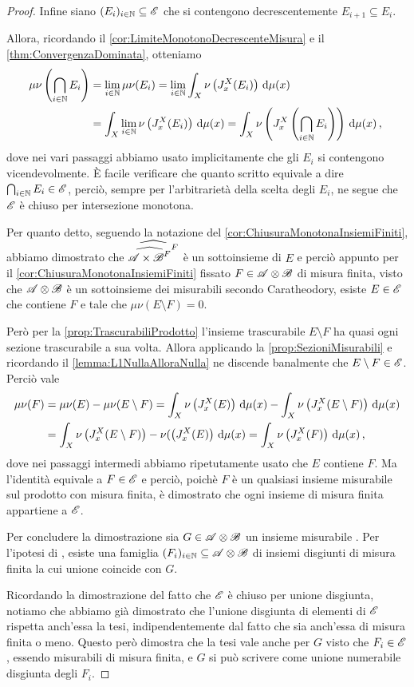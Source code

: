 \begin{proof}
	Infine siano $(E_i)_{i\in\mathbb N}\subseteq \mathscr E$ che si contengono decrescentemente $E_{i+1}\subseteq E_i$.
	
	Allora, ricordando il \cref{cor:LimiteMonotonoDecrescenteMisura} e il \cref{thm:ConvergenzaDominata}, otteniamo
	\begin{align*}
		\mu\nu\left(\bigcap_{i\in\mathbb N}E_i\right)&=\lim_{i\in\mathbb N}\mu\nu(E_i)=
		\lim_{i\in\mathbb N}\int_X\nu\left(J_x^X(E_i)\right)\,\mathrm d\mu(x)\\
		&=\int_X\lim_{i\in\mathbb N}\nu\left(J_x^X(E_i)\right)\,\mathrm d\mu(x)=
		\int_X\nu\left(J_x^X\left(\bigcap_{i\in\mathbb N}E_i\right)\right)\,\mathrm d\mu(x)\, \text{, }
	\end{align*}
	dove nei vari passaggi abbiamo usato implicitamente che gli $E_i$ si contengono vicendevolmente.
	È facile verificare che quanto scritto equivale a dire $\bigcap_{i\in\mathbb N}E_i\in\mathscr E$, perciò, sempre per l'arbitrarietà della scelta degli $E_i$, ne segue che $\mathscr E$ è chiuso per intersezione monotona.
	
	Per quanto detto, seguendo la notazione del \cref{cor:ChiusuraMonotonaInsiemiFiniti}, abbiamo dimostrato che $\widehat{\widehat{{\mathscr A\times\mathscr B}^F}^F}$ è un sottoinsieme di $E$ e perciò appunto per il \cref{cor:ChiusuraMonotonaInsiemiFiniti} fissato $F\in\mathscr A\otimes\mathscr B$ di misura finita, visto che $\mathscr A\otimes\mathscr B$ è un sottoinsieme dei misurabili secondo Caratheodory, esiste $E\in\mathscr E$ che contiene $F$ e tale che $\mu\nu(E\setminus F)=0$. 
	
	Però per la \cref{prop:TrascurabiliProdotto} l'insieme trascurabile $E\setminus F$ ha quasi ogni sezione trascurabile a sua volta.
	Allora applicando la \cref{prop:SezioniMisurabili} e ricordando il \cref{lemma:L1NullaAlloraNulla} ne discende banalmente che $E\setminus F\in\mathscr E$.
	Perciò vale
	\begin{align*}
		\mu\nu(F)&=\mu\nu(E)-\mu\nu(E\setminus F)=\int_X\nu\left(J_x^X(E)\right)\,\mathrm d\mu(x)-\int_X\nu\left(J_x^X(E\setminus F)\right)\,\mathrm d\mu(x)\\
		&=\int_X\nu\left(J_x^X(E\setminus F)\right)-\nu(\left(J_x^X(E)\right)\,\mathrm d\mu(x)
		=\int_X\nu\left(J_x^X(F)\right)\,\mathrm d\mu(x)\, \text{, }
	\end{align*}
	dove nei passaggi intermedi abbiamo ripetutamente usato che $E$ contiene $F$.
	Ma l'identità equivale a $F\in\mathscr E$ e perciò, poichè $F$ è un qualsiasi insieme misurabile sul prodotto con misura finita, è dimostrato che ogni insieme di misura finita appartiene a $\mathscr E$.
	
	Per concludere la dimostrazione sia $G\in\mathscr A\otimes\mathscr B$ un insieme misurabile \sigfin[o]. Per l'ipotesi di \sigfin[ezza], esiste una famiglia $(F_i)_{i\in\mathbb N}\subseteq \mathscr A\otimes\mathscr B$ di insiemi disgiunti di misura finita la cui unione coincide con $G$.
	
	Ricordando la dimostrazione del fatto che $\mathscr E$ è chiuso per unione disgiunta, notiamo che abbiamo già dimostrato che l'unione disgiunta di elementi di $\mathscr E$ rispetta anch'essa la tesi, indipendentemente dal fatto che sia anch'essa di misura finita o meno. Questo però dimostra che la tesi vale anche per $G$ visto che $F_i\in\mathscr E$, essendo misurabili di misura finita, e $G$ si può scrivere come unione numerabile disgiunta degli $F_i$. 
\end{proof}


